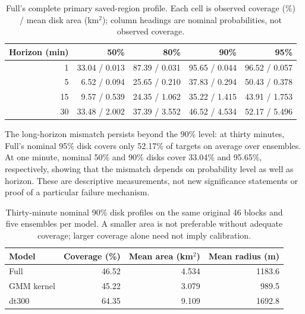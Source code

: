 \begin{table}[htbp]
\centering\small
\caption{Full's complete primary saved-region profile. Each cell is
observed coverage (\%) / mean disk area (km\(^{2}\)); column headings
are nominal probabilities, not observed coverage.}
\label{tab:full-calibration-area}\hypertarget{tab:full-calibration-area}{}
\begin{tabular}{rrrrr}
\toprule
Horizon (min) & 50\% & 80\% & 90\% & 95\%\\
\midrule
1 & 33.04 / 0.013 & 87.39 / 0.031 & 95.65 / 0.044 & 96.52 / 0.057\\
5 & 6.52 / 0.094 & 25.65 / 0.210 & 37.83 / 0.294 & 50.43 / 0.378\\
15 & 9.57 / 0.539 & 24.35 / 1.062 & 35.22 / 1.415 & 43.91 / 1.753\\
30 & 33.48 / 2.002 & 37.39 / 3.552 & 46.52 / 4.534 & 52.17 / 5.496\\
\bottomrule
\end{tabular}
\end{table}

The long-horizon mismatch persists beyond the 90\% level: at thirty minutes,
Full's nominal 95\% disk covers only 52.17\% of targets on average over
ensembles. At one minute, nominal 50\% and 90\% disks cover 33.04\% and
95.65\%, respectively, showing that the mismatch depends on probability
level as well as horizon. These are descriptive measurements, not new
significance statements or proof of a particular failure mechanism.

\begin{table}[htbp]
\centering\small
\caption{Thirty-minute nominal 90\% disk profiles on the same original
46 blocks and five ensembles per model. A smaller area is not preferable
without adequate coverage; larger coverage alone need not imply calibration.}
\label{tab:model-region-size}\hypertarget{tab:model-region-size}{}
\begin{tabular}{lrrr}
\toprule
Model & Coverage (\%) & Mean area (km\(^{2}\)) & Mean radius (m)\\
\midrule
Full & 46.52 & 4.534 & 1183.6\\
GMM kernel & 45.22 & 3.079 & 989.5\\
dt300 & 64.35 & 9.109 & 1692.8\\
\bottomrule
\end{tabular}
\end{table}

